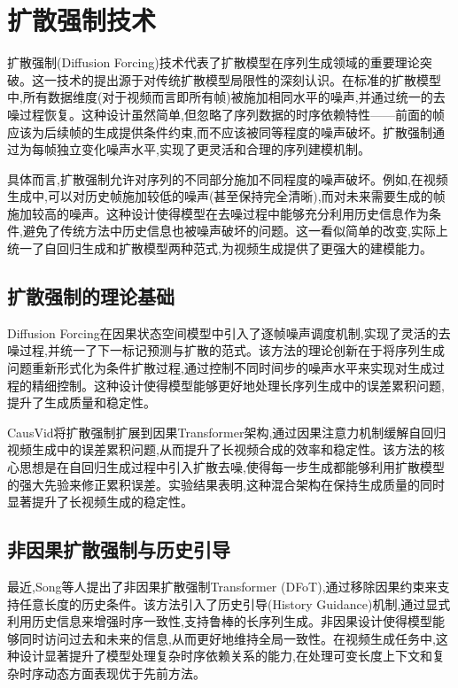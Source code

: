 \section{扩散强制技术}

扩散强制(Diffusion Forcing)技术代表了扩散模型在序列生成领域的重要理论突破。这一技术的提出源于对传统扩散模型局限性的深刻认识。在标准的扩散模型中,所有数据维度(对于视频而言即所有帧)被施加相同水平的噪声,并通过统一的去噪过程恢复。这种设计虽然简单,但忽略了序列数据的时序依赖特性——前面的帧应该为后续帧的生成提供条件约束,而不应该被同等程度的噪声破坏。扩散强制通过为每帧独立变化噪声水平,实现了更灵活和合理的序列建模机制。

具体而言,扩散强制允许对序列的不同部分施加不同程度的噪声破坏。例如,在视频生成中,可以对历史帧施加较低的噪声(甚至保持完全清晰),而对未来需要生成的帧施加较高的噪声。这种设计使得模型在去噪过程中能够充分利用历史信息作为条件,避免了传统方法中历史信息也被噪声破坏的问题。这一看似简单的改变,实际上统一了自回归生成和扩散模型两种范式,为视频生成提供了更强大的建模能力。

\subsection{扩散强制的理论基础}

Diffusion Forcing\cite{chen2024diffusion}在因果状态空间模型中引入了逐帧噪声调度机制,实现了灵活的去噪过程,并统一了下一标记预测与扩散的范式。该方法的理论创新在于将序列生成问题重新形式化为条件扩散过程,通过控制不同时间步的噪声水平来实现对生成过程的精细控制。这种设计使得模型能够更好地处理长序列生成中的误差累积问题,提升了生成质量和稳定性。

CausVid\cite{yin2024causvid}将扩散强制扩展到因果Transformer架构,通过因果注意力机制缓解自回归视频生成中的误差累积问题,从而提升了长视频合成的效率和稳定性。该方法的核心思想是在自回归生成过程中引入扩散去噪,使得每一步生成都能够利用扩散模型的强大先验来修正累积误差。实验结果表明,这种混合架构在保持生成质量的同时显著提升了长视频生成的稳定性。

\subsection{非因果扩散强制与历史引导}

最近,Song等人\cite{song2025history}提出了非因果扩散强制Transformer (DFoT),通过移除因果约束来支持任意长度的历史条件。该方法引入了历史引导(History Guidance)机制,通过显式利用历史信息来增强时序一致性,支持鲁棒的长序列生成。非因果设计使得模型能够同时访问过去和未来的信息,从而更好地维持全局一致性。在视频生成任务中,这种设计显著提升了模型处理复杂时序依赖关系的能力,在处理可变长度上下文和复杂时序动态方面表现优于先前方法。

